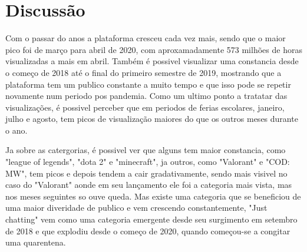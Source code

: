 \chapter{Discussão} \label{discussao}
Com o passar do anos a plataforma cresceu cada vez mais, sendo que o maior pico foi de março para abril de 2020, com aproxamadamente 573 milhões de horas visualizadas a mais em abril. Também é possivel visualizar uma constancia desde o começo de 2018 até o final do primeiro semestre de 2019, mostrando que a plataforma tem um publico constante a muito tempo e que isso pode se repetir novamente num periodo pos pandemia. Como um ultimo ponto a tratatar das visualizações, é possivel perceber que em periodos de ferias escolares, janeiro, julho e agosto, tem picos de visualização maiores do que os outros meses durante o ano.


Ja sobre as catergorias, é possivel ver que alguns tem maior constancia, como "league of legends", "dota 2" e "minecraft", ja outros, como "Valorant" e  "COD: MW", tem picos e depois tendem a cair gradativamente, sendo mais visivel no caso do "Valorant" aonde em seu lançamento ele foi a categoria mais vista, mas nos meses seguintes so ouve queda. Mas existe uma categoria que se beneficiou de uma maior diveridade de publico e vem crescendo constantemente, "Just chatting" vem como uma categoria emergente desde seu surgimento em setembro de 2018 e que explodiu desde o começo de 2020, quando começou-se a congitar uma quarentena.


